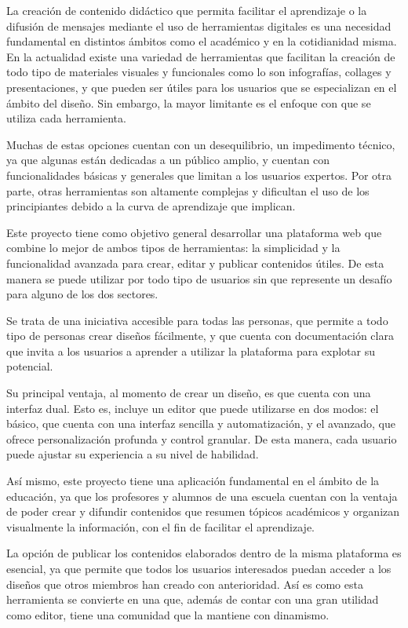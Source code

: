 \documentclass[12pt,a4paper]{report}
\begin{document}
La creación de contenido didáctico que permita facilitar el aprendizaje o la difusión de mensajes mediante el uso de herramientas digitales es una necesidad fundamental en distintos ámbitos como el académico y en la cotidianidad misma. En la actualidad existe una variedad de herramientas que facilitan la creación de todo tipo de materiales visuales y funcionales como lo son infografías, collages y presentaciones, y que pueden ser útiles para los usuarios que se especializan en el ámbito del diseño. Sin embargo, la mayor limitante es el enfoque con que se utiliza cada herramienta.

Muchas de estas opciones cuentan con un desequilibrio, un impedimento técnico, ya que algunas están dedicadas a un público amplio, y cuentan con funcionalidades básicas y generales que limitan a los usuarios expertos. Por otra parte, otras herramientas son altamente complejas y dificultan el uso de los principiantes debido a la curva de aprendizaje que implican.

Este proyecto tiene como objetivo general desarrollar una plataforma web que combine lo mejor de ambos tipos de herramientas: la simplicidad y la funcionalidad avanzada para crear, editar y publicar contenidos útiles. De esta manera se puede utilizar por todo tipo de usuarios sin que represente un desafío para alguno de los dos sectores.

Se trata de una iniciativa accesible para todas las personas, que permite a todo tipo de personas crear diseños fácilmente, y que cuenta con documentación clara que invita a los usuarios a aprender a utilizar la plataforma para explotar su potencial.

Su principal ventaja, al momento de crear un diseño, es que cuenta con una interfaz dual. Esto es, incluye un editor que puede utilizarse en dos modos: el básico, que cuenta con una interfaz sencilla y automatización, y el avanzado, que ofrece personalización profunda y control granular. De esta manera, cada usuario puede ajustar su experiencia a su nivel de habilidad.

Así mismo, este proyecto tiene una aplicación fundamental en el ámbito de la educación, ya que los profesores y alumnos de una escuela cuentan con la ventaja de poder crear y difundir contenidos que resumen tópicos académicos y organizan visualmente la información, con el fin de facilitar el aprendizaje.

La opción de publicar los contenidos elaborados dentro de la misma plataforma es esencial, ya que permite que todos los usuarios interesados puedan acceder a los diseños que otros miembros han creado con anterioridad. Así es como esta herramienta se convierte en una que, además de contar con una gran utilidad como editor, tiene una comunidad que la mantiene con dinamismo.
\end{document}
